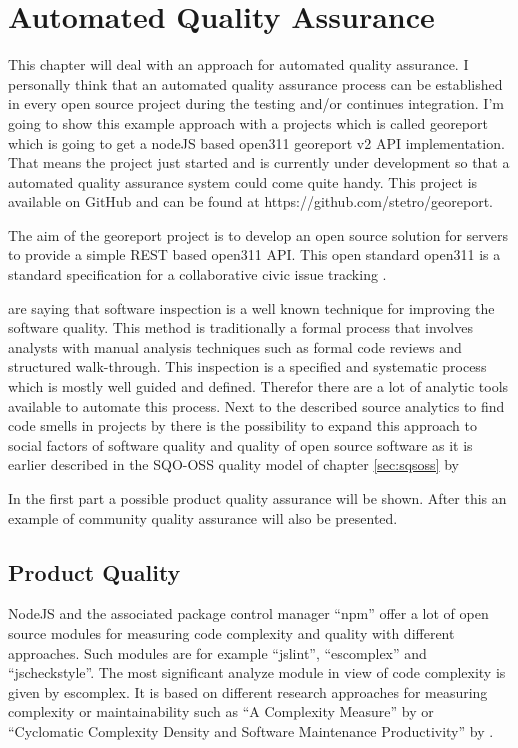 \documentclass[DIV=calc,paper=a4,fontsize=9pt,twocolumn]{scrartcl}
\begin{document}
\section{Automated Quality Assurance}\label{sec:automated-quality-assurance}

This chapter will deal with an approach for automated quality assurance. I personally think that an automated quality assurance process can be established in every open source project during the testing and/or continues integration. I'm going to show this example approach with a projects which is called georeport which is going to get a nodeJS based open311 georeport v2 API implementation. That means the project just started and is currently under development so that a automated quality assurance system could come quite handy. This project is available on GitHub and can be found at https://github.com/stetro/georeport.

The aim of the georeport project is to develop an open source solution for servers to provide a simple REST based open311 API. This open standard open311 is a standard specification for a collaborative civic issue tracking \citep{open311}.

\citet{van2002java} are saying that software inspection is a well known technique for improving the software quality. This method is traditionally a formal process that involves analysts with manual analysis techniques such as formal code reviews and structured walk-through. This inspection is a specified and systematic process which is mostly well guided and defined. Therefor there are a lot of analytic tools available to automate this process. Next to the described source analytics to find code smells in projects by \citet{van2002java} there is the possibility to expand this approach to social factors of software quality and quality of open source software as it is earlier described in the SQO-OSS quality model of chapter \ref{sec:sqsoss} by \citet{samoladas2008sqo}

In the first part a possible product quality assurance will be shown. After this an example of community quality assurance will also be presented.

\subsection{Product Quality}

NodeJS and the associated package control manager \enquote{npm} offer a lot of open source modules for measuring code complexity and quality with different approaches. Such modules are for example \enquote{jslint}, \enquote{escomplex} and \enquote{jscheckstyle}. The most significant analyze module in view of code complexity is given by escomplex. It is based on different research approaches for measuring complexity or maintainability such as \enquote{A Complexity Measure} by \citet{mccabe1976complexity} or \enquote{Cyclomatic Complexity Density and Software Maintenance Productivity} by \citet{gill1991cyclomatic}.
\end{document}
